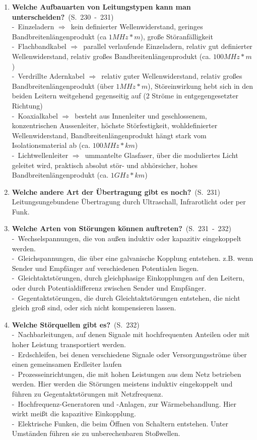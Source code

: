 \documentclass[a4paper,12pt]{article}
\newcommand{\question}[3]{\pagebreak[3]\item {\textbf{#1?}}\ (S.\ #2)#3}
\newcommand{\catchword}[1]{\\-\ #1}
\newcommand{\normaltext}[1]{\\#1}
\newcommand{\resultol}[1]{$\Rightarrow$\ #1}
\newcommand{\page}[1]{#1}
\newcommand{\pages}[2]{#1\ -\ #2}
\begin{document}
\begin{enumerate}
  \question{Welche Aufbauarten von Leitungstypen kann man unterscheiden}{\pages{230}{231}}
  {
    \catchword{Einzeladern \resultol{kein definierter Wellenwiderstand, geringes Bandbreitenlängenprodukt
               (ca $1 MHz * m$), große Störanfälligkeit}}
    \catchword{Flachbandkabel \resultol{parallel verlaufende Einzeladern, relativ gut definierter
               Wellenwiderstand, relativ großes Bandbreitenlängenprodukt (ca. $100 MHz * m$)}}
    \catchword{Verdrillte Adernkabel \resultol{relativ guter Wellenwiderstand, relativ großes
               Bandbreitenlängenprodukt (über $1 MHz * m$), Störeinwirkung hebt sich in den beiden
               Leitern weitgehend gegenseitig auf (2 Ströme in entgegengesetzter Richtung)}}
    \catchword{Koaxialkabel \resultol{besteht aus Innenleiter und geschlossenem, konzentrischen
               Aussenleiter, höchste Störfestigkeit, wohldefinierter Wellenwiderstand,
               Bandbreitenlängenprodukt hängt stark vom Isolationsmaterial ab (ca. $100 MHz * km$)}}
    \catchword{Lichtwellenleiter \resultol{ummantelte Glasfaser, über die moduliertes Licht geleitet
               wird, praktisch absolut stör- und abhörsicher, hohes Bandbreitenlängenprodukt
               (ca. $1 GHz * km$)}}
  }

  \question{Welche andere Art der Übertragung gibt es noch}{\page{231}}
  {
    \normaltext{Leitungsungebundene Übertragung durch Ultraschall, Infrarotlicht oder per Funk.}
  }

  \question{Welche Arten von Störungen können auftreten}{\pages{231}{232}}
  {
    \catchword{Wechselspannungen, die von außen induktiv oder kapazitiv eingekoppelt werden.}
    \catchword{Gleichspannungen, die über eine galvanische Kopplung entstehen. z.B. wenn Sender und
               Empfänger auf verschiedenen Potentialen liegen.}
    \catchword{Gleichtaktstörungen, durch gleichphasige Einkopplungen auf den Leitern, oder durch
               Potentialdifferenz zwischen Sender und Empfänger.}
    \catchword{Gegentaktstörungen, die durch Gleichtaktstörungen entstehen, die nicht gleich groß
               sind, oder sich nicht kompensieren lassen.}
  }

  \question{Welche Störquellen gibt es}{\page{232}}
  {
    \catchword{Nachbarleitungen, auf denen Signale mit hochfrequenten Anteilen oder mit hoher
               Leistung transportiert werden.}
    \catchword{Erdschleifen, bei denen verschiedene Signale oder Versorgungsströme über einen gemeinsamen
               Erdleiter laufen}
    \catchword{Prozesseinrichtungen, die mit hohen Leistungen aus dem Netz betrieben werden. Hier
               werden die Störungen meistens induktiv eingekoppelt und führen zu Gegentaktstörungen mit
               Netzfrequenz.}
    \catchword{Hochfrequenz-Generatoren und -Anlagen, zur Wärmebehandlung. Hier wirkt meißt die
               kapazitive Einkopplung.}
    \catchword{Elektrische Funken, die beim Öffnen von Schaltern entstehen. Unter Umständen führen
               sie zu unberechenbaren Stoßwellen.}
  }


\end{enumerate}
\end{document}
